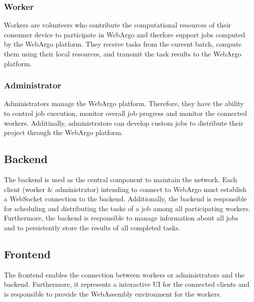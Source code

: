 \subsubsection{Worker}
\label{subsec:concept:worker}
Workers are volunteers who contribute the computational resources of their consumer device to participate in WebArgo and therfore support jobs computed by the WebArgo platform. They receive tasks from the current batch, compute them using their local resources, and transmit the task results to the WebArgo platform.

\subsubsection{Administrator}
\label{ssubsec:concept:admin}
Administrators manage the WebArgo platform. Therefore, they have the ability to control job execution, monitor overall job progress and monitor the connected workers. Additinally, administrators can develop custom jobs to distribute their project through the WebArgo platform.

\subsection{Backend}
\label{subsec:concept:backend}
The backend is used as the central component to maintain the network. Each client (worker \& administrator) intending to connect to WebArgo must establish a WebSocket connection to the backend. Additionally, the backend is responsible for scheduling and distributing the tasks of a job among all participating workers. Furthermore, the backend is responsible to manage information about all jobs and to persistently store the results of all completed tasks.

\subsection{Frontend}
\label{subsec:concept:frontend}
The frontend enables the connection between workers or administrators and the backend. Furthermore, it represents a interactive \ac{UI} for the connected clients and is responsible to provide the WebAssembly environment for the workers.

